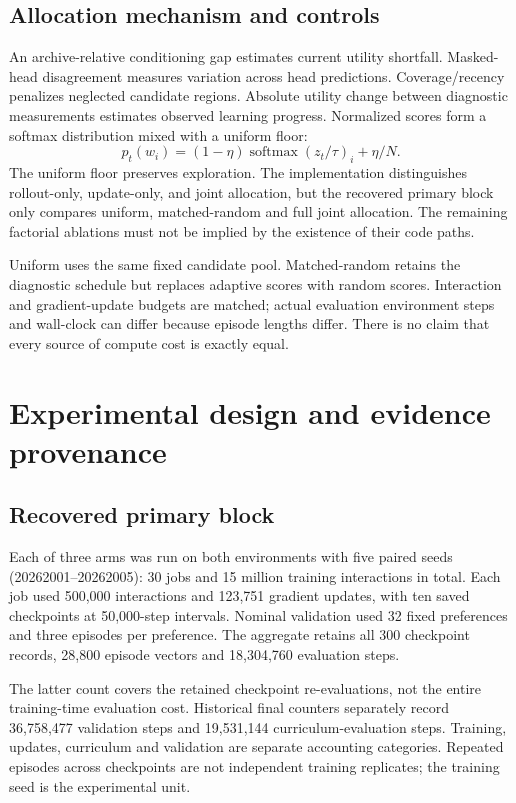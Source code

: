 \subsection{Allocation mechanism and controls}
An archive-relative conditioning gap estimates current utility shortfall.
Masked-head disagreement measures variation across head predictions.
Coverage/recency penalizes neglected candidate regions. Absolute utility change
between diagnostic measurements estimates observed learning progress.
Normalized scores form a softmax distribution mixed with a uniform floor:
\[
 p_t(w_i)=(1-\eta)\operatorname{softmax}(z_t/\tau)_i+\eta/N.
\]
The uniform floor preserves exploration. The implementation distinguishes
rollout-only, update-only, and joint allocation, but the recovered primary block
only compares uniform, matched-random and full joint allocation. The remaining
factorial ablations must not be implied by the existence of their code paths.

Uniform uses the same fixed candidate pool. Matched-random retains the
diagnostic schedule but replaces adaptive scores with random scores. Interaction
and gradient-update budgets are matched; actual evaluation environment steps
and wall-clock can differ because episode lengths differ. There is no claim
that every source of compute cost is exactly equal.

\section{Experimental design and evidence provenance}
\subsection{Recovered primary block}
Each of three arms was run on both environments with five paired seeds
(20262001--20262005): 30 jobs and 15 million training interactions in total.
Each job used 500,000 interactions and 123,751 gradient updates, with ten saved
checkpoints at 50,000-step intervals. Nominal validation used 32 fixed preferences
and three episodes per preference. The aggregate retains all 300 checkpoint
records, 28,800 episode vectors and 18,304,760 evaluation steps.

The latter count covers the retained checkpoint re-evaluations, not the entire
training-time evaluation cost. Historical final counters separately record
36,758,477 validation steps and 19,531,144 curriculum-evaluation steps.
Training, updates, curriculum and validation are separate accounting categories.
Repeated episodes across checkpoints are not independent training replicates;
the training seed is the experimental unit.

